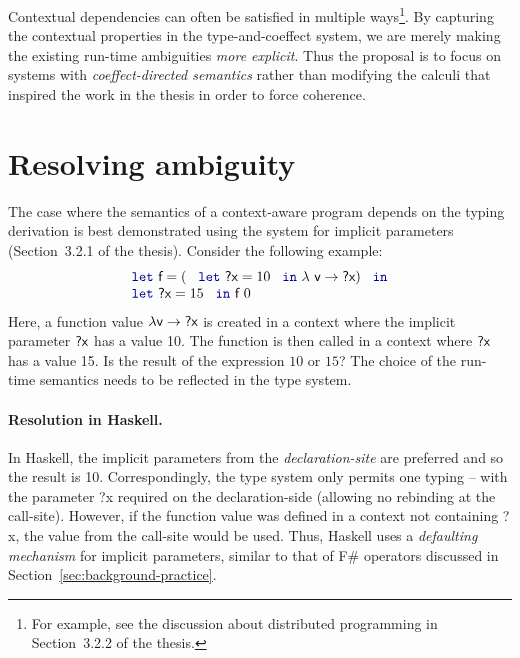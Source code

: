 \documentclass[
		twoside,openright,titlepage,numbers=noenddot,headinclude,%
                footinclude=true,cleardoublepage=empty,
                BCOR=10mm,paper=a4,fontsize=10pt, %
                ngerman,american, %
                ]{scrreprt}
\newcommand{\kvd}[1]{\textnormal{\textcolor{kvdclr}{\ttfamily #1}}}
\newcommand{\ident}[1]{\textnormal{\sffamily #1}}
\begin{document}
\noindent
Contextual dependencies can often be satisfied in multiple ways\footnote{For example, see the
discussion about distributed programming in Section~3.2.2 of the thesis.}. By capturing the
contextual properties in the type-and-coeffect system, we are merely making the existing
run-time ambiguities \emph{more explicit}. Thus the proposal is to focus on systems with
\emph{coeffect-directed semantics} rather than modifying the calculi that inspired the work
in the thesis in order to force coherence.

\section{Resolving ambiguity}
\label{sec:ambiguity}

The case where the semantics of a context-aware program depends on the typing derivation is best
demonstrated using the system for implicit parameters (Section~3.2.1 of the thesis). Consider the
following example:
%
\begin{equation*}
\begin{array}{l}
\kvd{let}~\ident{f} = (~\kvd{let}~\ident{?x} = 10~\kvd{in}~
  \lambda \ident{v} \rightarrow \ident{?x})~\kvd{in}\\
\kvd{let}~\ident{?x} = 15~\kvd{in}~\ident{f}~0
\end{array}
\end{equation*}
%
Here, a function value $\lambda \ident{v} \rightarrow \ident{?x}$ is created in a context where the
implicit parameter $\ident{?x}$ has a value 10. The function is then called in a context where
$\ident{?x}$ has a value 15. Is the result of the expression $10$ or $15$? The choice of the
run-time semantics needs to be reflected in the type system.

\paragraph{Resolution in Haskell.}
In Haskell, the implicit parameters from the \emph{declaration-site} are preferred and so the result
is 10. Correspondingly, the type system only permits one typing -- with the parameter \ident{?x}
required on the declaration-side (allowing no rebinding at the call-site). However, if the function
value was defined in a context not containing \ident{?x}, the value from the call-site would be used.
Thus, Haskell uses a \emph{defaulting mechanism} for implicit parameters, similar to that of F\#
operators discussed in Section~\ref{sec:background-practice}.
\end{document}
